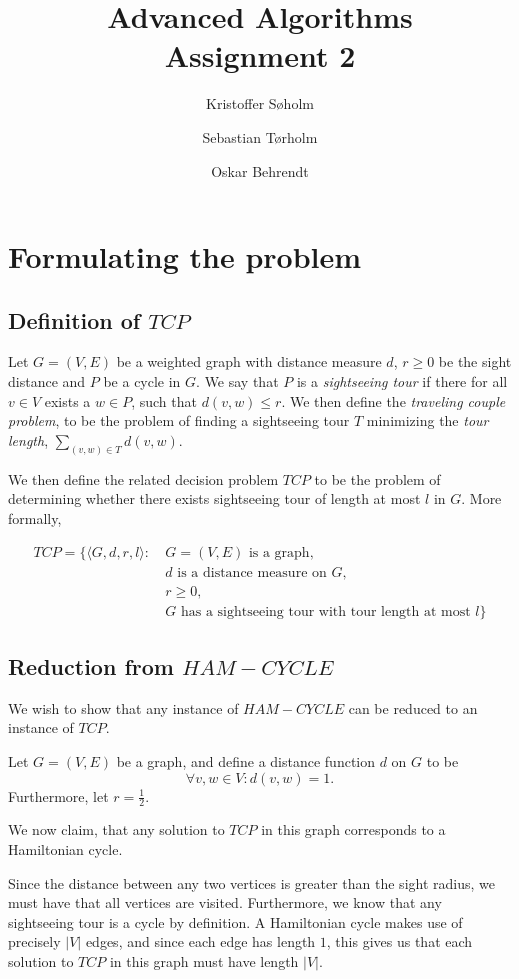\documentclass[11pt,a4paper]{article}
\title{Advanced Algorithms\\Assignment 2}
\author{Kristoffer Søholm \and Sebastian Tørholm \and Oskar Behrendt}
\begin{document}
\maketitle

\section{Formulating the problem}
\subsection{Definition of $TCP$}
Let $G = (V, E)$ be a weighted graph with distance measure $d$,
$r \geq 0$ be the sight distance and $P$ be a cycle in $G$. We say
that $P$ is a \emph{sightseeing tour} if there for all $v \in V$ exists a
$w \in P$, such that $d(v, w) \leq r$. We then define the \emph{traveling
couple problem}, to be the problem of finding a sightseeing tour $T$ minimizing
the \emph{tour length}, $\sum_{(v,w) \in T} d(v, w)$.

We then define the related decision problem $TCP$ to be the problem of determining
whether there exists sightseeing tour of length at most $l$ in $G$. More formally,

\begin{align*}
    TCP = \{ \langle G, d, r, l \rangle :\ & G = (V,E) \text{ is a graph}, \\
                                           & d \text{ is a distance measure on } G, \\
                                           & r \geq 0, \\
                                           & G \text{ has a sightseeing tour with tour length at most } l \}
\end{align*}

\subsection{Reduction from $HAM-CYCLE$}
We wish to show that any instance of $HAM-CYCLE$ can be reduced to an instance of $TCP$.

Let $G = (V, E)$ be a graph, and define a distance function $d$ on $G$ to be
\[
    \forall v, w \in V : d(v, w) = 1.
\]
Furthermore, let $r = \frac{1}{2}$.

We now claim, that any solution to $TCP$ in this graph corresponds to a Hamiltonian cycle.

Since the distance between any two vertices is greater than the sight radius, we must have that
all vertices are visited. Furthermore, we know that any sightseeing tour is a cycle by definition.
A Hamiltonian cycle makes use of precisely $|V|$ edges, and since each edge has length $1$, this gives
us that each solution to $TCP$ in this graph must have length $|V|$.
\end{document}
